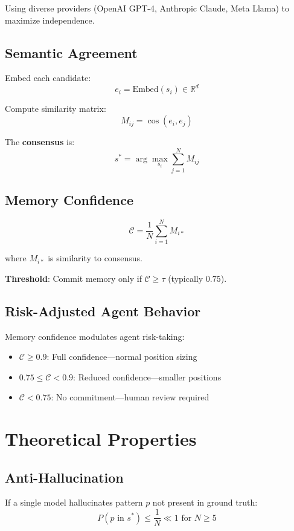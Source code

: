 \documentclass[11pt,a4paper]{article}
\begin{document}
Using diverse providers (OpenAI GPT-4, Anthropic Claude, Meta Llama) 
to maximize independence.

\subsection{Semantic Agreement}

Embed each candidate:
\[
e_i = \text{Embed}(s_i) \in \mathbb{R}^d
\]

Compute similarity matrix:
\[
M_{ij} = \cos(e_i, e_j)
\]

The \textbf{consensus} is:
\[
s^* = \arg\max_{s_i} \sum_{j=1}^N M_{ij}
\]

\subsection{Memory Confidence}

\[
\mathcal{C} = \frac{1}{N}\sum_{i=1}^N M_{i*}
\]

where $M_{i*}$ is similarity to consensus.

\textbf{Threshold}: Commit memory only if $\mathcal{C} \geq \tau$ 
(typically $0.75$).

\subsection{Risk-Adjusted Agent Behavior}

Memory confidence modulates agent risk-taking:

\begin{itemize}
  \item $\mathcal{C} \geq 0.9$: Full confidence---normal position sizing
  \item $0.75 \leq \mathcal{C} < 0.9$: Reduced confidence---smaller positions
  \item $\mathcal{C} < 0.75$: No commitment---human review required
\end{itemize}

\section{Theoretical Properties}

\subsection{Anti-Hallucination}

If a single model hallucinates pattern $p$ not present in ground truth:
\[
P(p \text{ in } s^*) \leq \frac{1}{N} \ll 1 \text{ for } N \geq 5
\]
\end{document}
